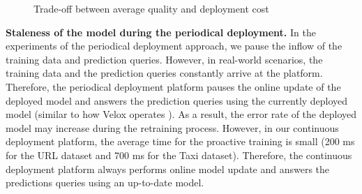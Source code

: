 \begin{figure}[!h]
\centering
\resizebox{\columnwidth}{!}{}
\caption{Trade-off between average quality and deployment cost}
 \vspace{-10pt}
\label{trade-off-figure}
\end{figure}

\textbf{Staleness of the model during the periodical deployment.}
In the experiments of the periodical deployment approach, we pause the inflow of the training data and prediction queries.
However, in real-world scenarios, the training data and the prediction queries constantly arrive at the platform.
Therefore, the periodical deployment platform pauses the online update of the deployed model and answers the prediction queries using the currently deployed model (similar to how Velox operates \cite{crankshaw2014missing}).
As a result, the error rate of the deployed model may increase during the retraining process.
However, in our continuous deployment platform, the average time for the proactive training is small (200 ms for the URL dataset and 700 ms for the Taxi dataset).
Therefore, the continuous deployment platform always performs online model update and answers the predictions queries using an up-to-date model.